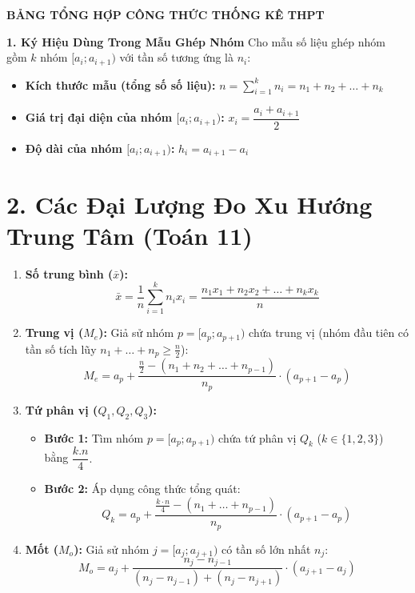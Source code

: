 \documentclass[12pt, a4paper]{article}
\begin{document}


\begin{center}
    {\Large\bfseries BẢNG TỔNG HỢP CÔNG THỨC THỐNG KÊ THPT}\\[4pt]
\end{center}

\vspace{0.3cm}

\textbf{1. Ký Hiệu Dùng Trong Mẫu Ghép Nhóm}
Cho mẫu số liệu ghép nhóm gồm $k$ nhóm $[a_i; a_{i+1})$ với tần số tương ứng là $n_i$:
\begin{itemize}
    \item \textbf{Kích thước mẫu (tổng số số liệu):} $n = \sum_{i=1}^{k} n_i = n_1 + n_2 + \dots + n_k$
    \item \textbf{Giá trị đại diện của nhóm $[a_i; a_{i+1})$:} $x_i = \dfrac{a_i + a_{i+1}}{2}$
    \item \textbf{Độ dài của nhóm $[a_i; a_{i+1})$:} $h_i = a_{i+1} - a_i$
\end{itemize}


\section*{2. Các Đại Lượng Đo Xu Hướng Trung Tâm (Toán 11)}

\begin{enumerate}
    \item \textbf{Số trung bình ($\bar{x}$):}
    \[
    \bar{x} = \frac{1}{n} \sum_{i=1}^{k} n_i x_i = \frac{n_1 x_1 + n_2 x_2 + \dots + n_k x_k}{n}
    \]

    \item \textbf{Trung vị ($M_e$):}
    Giả sử nhóm $p = [a_p; a_{p+1})$ chứa trung vị (nhóm đầu tiên có tần số tích lũy $n_1 + \dots + n_p \ge \frac{n}{2}$):
    \[
    M_e = a_p + \frac{\frac{n}{2} - (n_1 + n_2 + \dots + n_{p-1})}{n_p} \cdot (a_{p+1} - a_p)
    \]

\item \textbf{Tứ phân vị ($Q_1, Q_2, Q_3$):}
    \begin{itemize}
        \item \textbf{Bước 1:} Tìm nhóm $p = [a_p; a_{p+1})$ chứa tứ phân vị $Q_k$ ($k \in \{1, 2, 3\}$) bằng \(\dfrac{k.n}{4}.\)
        \item \textbf{Bước 2:} Áp dụng công thức tổng quát:
        \[
        Q_k = a_p + \frac{\frac{k \cdot n}{4} - (n_1 + \dots + n_{p-1})}{n_p} \cdot (a_{p+1} - a_p)
        \]
    \end{itemize}

    \item \textbf{Mốt ($M_o$):}
    Giả sử nhóm $j = [a_j; a_{j+1})$ có tần số lớn nhất $n_j$:
    \[
    M_o = a_j + \frac{n_j - n_{j-1}}{(n_j - n_{j-1}) + (n_j - n_{j+1})} \cdot (a_{j+1} - a_j)
    \]
\end{enumerate}
\end{document}
